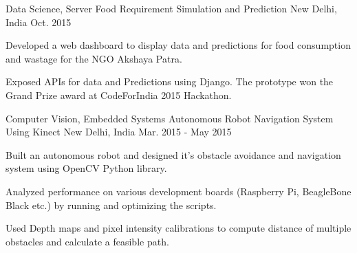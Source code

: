 \begin{cventries}
{\begin{cvitems}
      \end{cvitems}
    }
  \cventry
    {Data Science, Server}
    {Food Requirement Simulation and Prediction}
    {New Delhi, India}
    {Oct. 2015}
    {
      \begin{cvitems}
        \item {Developed a web dashboard to display data and predictions for food consumption and wastage for the NGO Akshaya Patra.}
        \item {Exposed APIs for data and Predictions using Django. The prototype won the Grand Prize award at CodeForIndia 2015 Hackathon.}
      \end{cvitems} 
    }
  \cventry
    {Computer Vision, Embedded Systems}
    {Autonomous Robot Navigation System Using Kinect}
    {New Delhi, India}
    {Mar. 2015 - May 2015}
    {
      \begin{cvitems}
        \item {Built an autonomous robot and designed it’s obstacle avoidance and navigation system using OpenCV Python library.}
        \item {Analyzed performance on various development boards (Raspberry Pi, BeagleBone Black etc.) by running and optimizing the scripts.}
        \item {Used Depth maps and pixel intensity calibrations to compute distance of multiple obstacles and calculate a feasible path.}
      \end{cvitems} 
    }
\end{cventries}
